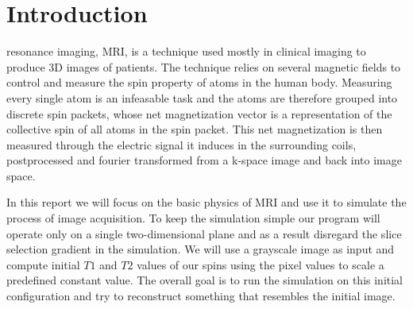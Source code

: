 


\section{Introduction}


 resonance imaging, MRI, is a technique used
mostly in clinical imaging to produce 3D images of patients. The
technique relies on several magnetic fields to control and measure the
spin property of atoms in the human body. Measuring every single atom
is an infeasable task and the atoms are therefore grouped into
discrete spin packets, whose net magnetization vector is a
representation of the collective spin of all atoms in the spin
packet. This net magnetization is then measured through the electric
signal it induces in the surrounding coils, postprocessed and fourier
transformed from a k-space image and back into image space.


In this report we will focus on the basic physics of MRI and use it to
simulate the process of image acquisition. To keep the simulation
simple our program will operate only on a single two-dimensional plane
and as a result disregard the slice selection gradient in the
simulation. We will use a grayscale image as input and compute initial
$T1$ and $T2$ values of our spins using the pixel values to scale a
predefined constant value. The overall goal is to run the simulation
on this initial configuration and try to reconstruct something that
resembles the initial image.

